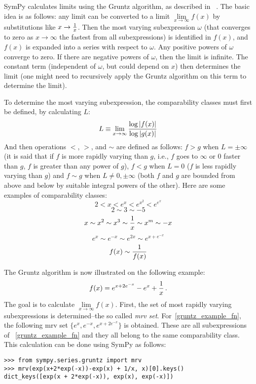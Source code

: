 SymPy calculates limits using the Gruntz algorithm, as described in%
~\cite{Gruntz1996limits}. The basic idea is as follows: any limit can be
converted to a limit $\lim\limits_{x\to\infty} f(x)$ by substitutions like
$x\to{1\over x}$. Then the most varying subexpression $\omega$ (that converges
to zero as $x\to\infty$ the fastest from all subexpressions) is identified in
$f(x)$, and $f(x)$ is expanded into a series with respect to $\omega$. Any
positive powers of $\omega$ converge to zero. If there are negative powers of
$\omega$, then the limit is infinite. The constant term (independent of
$\omega$, but could depend on $x$) then determines the limit (one might need to
recursively apply the Gruntz algorithm on this term to determine the limit).

To determine the most varying subexpression, the comparability classes must
first be defined, by calculating $L$:
\begin{equation}
L\equiv \lim_{x\to\infty} {\log |f(x)| \over \log |g(x)|}
\end{equation}
And then operations $<$, $>$, and $\sim$ are defined as follows: $f>g$ when
$L=\pm\infty$ (it is said that if $f$ is more rapidly varying than $g$, i.e., $f$
goes to $\infty$ or $0$ faster than $g$, $f$ is greater than any power of $g$),
$f<g$ when $L=0$ ($f$ is less rapidly varying than $g$) and $f\sim g$ when
$L\neq 0,\pm\infty$ (both $f$ and $g$ are bounded from above and below by
suitable integral powers of the other). Here are some examples of comparability
classes:
$$2 < x < e^x < e^{x^2} < e^{e^x}$$
$$2\sim 3\sim -5$$
$$x\sim x^2\sim x^3\sim {1\over x}\sim x^m\sim -x$$
$$e^x\sim e^{-x}\sim e^{2x}\sim e^{x+e^{-x}}$$
$$f(x)\sim{1\over f(x)}$$

The Gruntz algorithm is now illustrated on the following example:
\begin{equation}
    \label{gruntz_example_fn}
f(x) = e^{x+2e^{-x}} - e^x + {1\over x} \,.
\end{equation}
The goal is to calculate $\lim\limits_{x\to\infty} f(x)$.
First, the set of most rapidly varying subexpressions is determined--the so
called \textit{mrv set}. For~\eqref{gruntz_example_fn}, the following mrv set
$\{e^x, e^{-x}, e^{x+2e^{-x}}\}$ is obtained. These are all subexpressions of%
~\eqref{gruntz_example_fn} and they all belong to the same comparability class.
This calculation can be done using SymPy as follows:

\begin{verbatim}
>>> from sympy.series.gruntz import mrv
>>> mrv(exp(x+2*exp(-x))-exp(x) + 1/x, x)[0].keys()
dict_keys([exp(x + 2*exp(-x)), exp(x), exp(-x)])
\end{verbatim}

